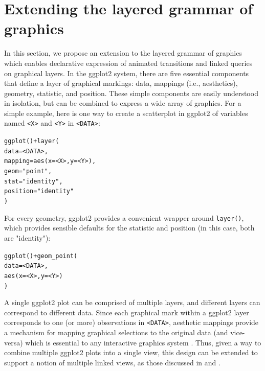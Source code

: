 \documentclass[journal]{vgtc}\usepackage[]{graphicx}\usepackage[]{color}
\makeatletter
\newcommand{\hlstr}[1]{\textcolor[rgb]{0.502,0,0}{#1}}%
\newcommand{\hlkwd}[1]{\textcolor[rgb]{0,0,0}{#1}}%
\newenvironment{kframe}{%
 \def\at@end@of@kframe{}%
 \ifinner\ifhmode%
  \def\at@end@of@kframe{\end{minipage}}%
  \begin{minipage}{\columnwidth}%
 \fi\fi%
 \def\FrameCommand##1{\hskip\@totalleftmargin \hskip-\fboxsep
 \colorbox{shadecolor}{##1}\hskip-\fboxsep
     \hskip-\linewidth \hskip-\@totalleftmargin \hskip\columnwidth}%
 \MakeFramed {\advance\hsize-\width
   \@totalleftmargin\z@ \linewidth\hsize
   \@setminipage}}%
 {\par\unskip\endMakeFramed%
 \at@end@of@kframe}
\newenvironment{knitrout}{}{} %
\makeatother
\begin{document}
\section{Extending the layered grammar of graphics}

In this section, we propose an extension to the layered grammar of graphics \citep{ggplot2-paper} which enables declarative expression of animated transitions and linked queries on graphical layers. In the ggplot2 system, there are five essential components that define a layer of graphical markings: data, mappings (i.e., aesthetics), geometry, statistic, and position. These simple components are easily understood in isolation, but can be combined to express a wide array of graphics. For a simple example, here is one way to create a scatterplot in ggplot2 of variables named \texttt{<X>} and \texttt{<Y>} in \texttt{<DATA>}:

\begin{knitrout}
\color{fgcolor}\begin{kframe}
\begin{alltt}
\hlkwd{ggplot}() + \hlkwd{layer}(
  data = <DATA>, 
  mapping = \hlkwd{aes}(x = <X>, y = <Y>), 
  geom = \hlstr{"point"}, 
  stat = \hlstr{"identity"},
  position = \hlstr{"identity"}
)
\end{alltt}
\end{kframe}
\end{knitrout}

For every geometry, ggplot2 provides a convenient wrapper around \texttt{layer()}, which provides sensible defaults for the statistic and position (in this case, both are "identity"):

\begin{knitrout}
\color{fgcolor}\begin{kframe}
\begin{alltt}
\hlkwd{ggplot}() + \hlkwd{geom_point}(
  data = <DATA>, 
  \hlkwd{aes}(x = <X>, y = <Y>)
)
\end{alltt}
\end{kframe}
\end{knitrout}

A single ggplot2 plot can be comprised of multiple layers, and different layers can correspond to different data. Since each graphical mark within a ggplot2 layer corresponds to one (or more) observations in \texttt{<DATA>}, aesthetic mappings provide a mechanism for mapping graphical selections to the original data (and vice-versa) which is essential to any interactive graphics system \citep{viewing-pipeline, plumbing}. Thus, given a way to combine multiple ggplot2 plots into a single view, this design can be extended to support a notion of multiple linked views, as those discussed in \citep{Ahlberg:1991} and \citep{Buja:1991vh}.
\end{document}
